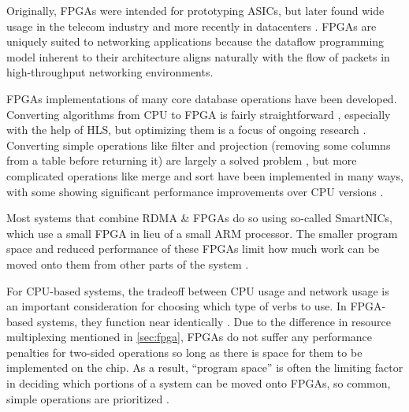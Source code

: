 Originally, FPGAs were intended for prototyping ASICs, but later found wide usage in the telecom industry \autocite{bobda-trets-2022,mencer-queue-2020} and more recently in datacenters \autocite{mencer-queue-2020,hoozemans-cas-2021}. FPGAs are uniquely suited to networking applications because the dataflow programming model \autocite{hoozemans-cas-2021} inherent to their architecture aligns naturally with the flow of packets in high-throughput networking environments.

FPGAs implementations of many core database operations have been developed. Converting algorithms from CPU to FPGA is fairly straightforward \autocite{fang-vldb-2020}, especially with the help of HLS, but optimizing them is a focus of ongoing research \autocite{fang-vldb-2020}. Converting simple operations like filter and projection (removing some columns from a table before returning it) are largely a solved problem \autocite{fang-vldb-2020}, but more complicated operations like merge and sort have been implemented in many ways, with some showing significant performance improvements over CPU versions \autocite{leggett-trets-2025,moghaddamfar-damon-2021}.


\label{sec:rdma-fpga}

Most systems that combine RDMA \& FPGAs do so using so-called SmartNICs, which use a small FPGA in lieu of a small ARM processor. The smaller program space and reduced performance of these FPGAs limit how much work can be moved onto them from other parts of the system \autocite{honeycomb}.

For CPU-based systems, the tradeoff between CPU usage and network usage is an important consideration for choosing which type of verbs to use. In FPGA-based systems, they function near identically \autocite{strom}. Due to the difference in resource multiplexing mentioned in \autoref{sec:fpga}, FPGAs do not suffer any performance penalties for two-sided operations so long as there is space for them to be implemented on the chip. As a result, ``program space'' is often the limiting factor in deciding which portions of a system can be moved onto FPGAs, so common, simple operations are prioritized \autocite{honeycomb,moghaddamfar-damon-2021}.
